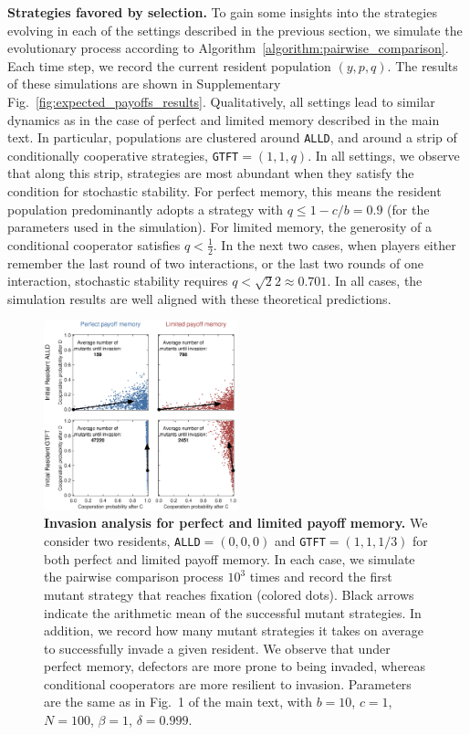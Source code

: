 \documentclass[11pt]{article}
\def\alld{\texttt{ALLD}}
\def\gtft{\texttt{GTFT}}
\theoremstyle{plainCl1}
\theoremstyle{plainCl2}
\begin{document}
{\bf Strategies favored by selection.} 
To gain some insights into the strategies evolving in each of the settings described in the previous section, we simulate the evolutionary process according to Algorithm~\ref{algorithm:pairwise_comparison}. 
Each time step, we record the current resident population \((y, p, q)\). 
The results of these simulations are shown in Supplementary Fig.~\ref{fig:expected_payoffs_results}. 
Qualitatively, all settings lead to similar dynamics as in the case of perfect and limited memory described in the main text. 
In particular, populations are clustered around \alld, and around a strip of conditionally cooperative strategies, \gtft$=\!(1,1,q)$. 
In all settings, we observe that along this strip, strategies are most abundant when they satisfy the condition for stochastic stability. 
For perfect memory, this means the resident population predominantly adopts a strategy with \(q\! \leq\! 1 \!-\!
c/b\!=\!0.9\) (for the parameters used in the simulation). 
For limited memory, the generosity of a conditional cooperator satisfies  \(q\!<\!\frac{1}{2}\). 
In the next two cases, when players either remember the last round of two interactions, or the last two rounds of one interaction, stochastic stability requires $q\!<\!\sqrt{2}{2}\!\approx\!0.701$. 
In all cases, the simulation results are well aligned with these theoretical predictions.\\



\begin{figure}[t!]
    \centering    
     \includegraphics[width=0.5\textwidth]{static/invasion_analysis.eps}
    \caption{\textbf{Invasion analysis for perfect and limited payoff memory.} We consider two residents, \alld{}$=(0,0,0)$ and \gtft$=(1,1,1/3)$ for both perfect and limited payoff memory. In each case, we simulate the pairwise comparison process $10^{3}$ times and record the first mutant strategy that reaches fixation (colored dots). Black arrows indicate the arithmetic mean of the successful mutant strategies. In addition, we record how many mutant strategies it takes on average to successfully invade a given resident. We observe that under perfect memory, defectors are more prone to being invaded, whereas conditional cooperators are more resilient to invasion. Parameters are the same as in Fig.~1 of the main text, with $b\!=\!10$, $c\!=\!1$, $N\!=\!100$, $\beta\!=\!1$, $\delta\!=\!0.999$.}
    \label{fig:invasion_analysis}
\end{figure}
\end{document}
